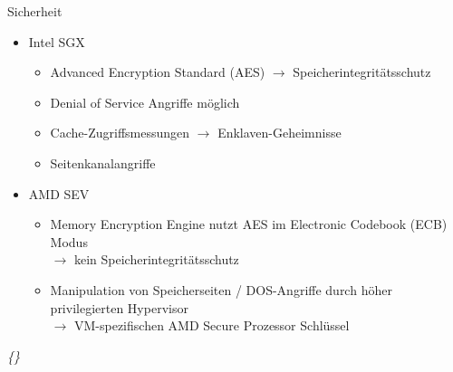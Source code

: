 \documentclass{sdqbeamer}
\begin{document}
\begin{frame}{Sicherheit}
	\begin{itemize}
		\item Intel SGX
		\begin{itemize}
			\item Advanced Encryption Standard (AES)
				\(\rightarrow\) Speicherintegritätsschutz
			\item Denial of Service Angriffe möglich
			\item Cache-Zugriffsmessungen \(\rightarrow\) Enklaven-Geheimnisse
			\item Seitenkanalangriffe
		\end{itemize}
		\item AMD SEV
		\begin{itemize}
			\item Memory Encryption Engine nutzt AES im Electronic Codebook (ECB) Modus \\
				\(\rightarrow\) kein Speicherintegritätsschutz
			\item Manipulation von Speicherseiten / DOS-Angriffe durch höher privilegierten Hypervisor\\
			\(\rightarrow\) VM-spezifischen AMD Secure Prozessor Schlüssel
		\end{itemize}
	\end{itemize}
	\vfill
	\small\textit{\{\cite{mofrad}\}}
\end{frame}
\end{document}
